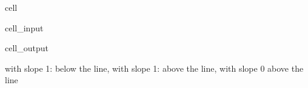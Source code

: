 \documentclass[letterpaper,10pt,english]{jupyterBook}
\begin{document}
\begin{sphinxuseclass}{cell}\begin{sphinxVerbatimInput}

\begin{sphinxuseclass}{cell_input}
\begin{sphinxVerbatim}[commandchars=\\\{\}]




\end{sphinxVerbatim}

\end{sphinxuseclass}\end{sphinxVerbatimInput}
\begin{sphinxVerbatimOutput}

\begin{sphinxuseclass}{cell_output}
\noindent{}

\end{sphinxuseclass}\end{sphinxVerbatimOutput}

\end{sphinxuseclass}
\sphinxAtStartPar
with slope 1: below the line, with slope \sphinxhyphen{}1: above the line, with slope 0 above the line
\end{document}
